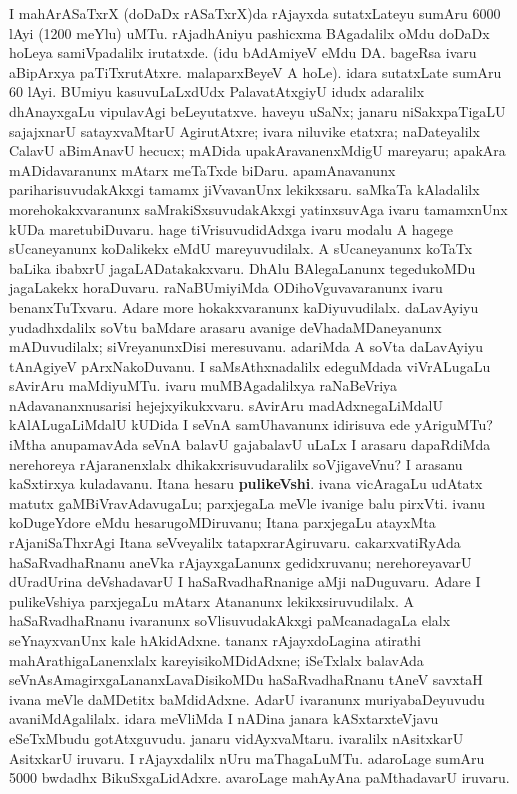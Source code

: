 \documentclass[11pt,a4size]{article}
\begin{document}
I mahArASaTxrX (doDaDx rASaTxrX)da rAjayxda sutatxLateyu sumAru 6000
lAyi (1200 meYlu) uMTu. rAjadhAniyu pashicxma BAgadalilx oMdu doDaDx
hoLeya samiVpadalilx irutatxde. (idu bAdAmiyeV eMdu DA. bageRsa ivaru
aBipArxya paTiTxrutAtxre. malaparxBeyeV A hoLe). idara sutatxLate
sumAru 60 lAyi. BUmiyu kasuvuLaLxdUdx PalavatAtxgiyU idudx adaralilx
dhAnayxgaLu vipulavAgi beLeyutatxve. haveyu uSaNx; janaru
niSakxpaTigaLU sajajxnarU satayxvaMtarU AgirutAtxre; ivara niluvike
etatxra; naDateyalilx CalavU aBimAnavU hecucx; mADida
upakAravanenxMdigU mareyaru; apakAra mADidavaranunx mAtarx meTaTxde
biDaru. apamAnavanunx pariharisuvudakAkxgi tamamx jiVvavanUnx
lekikxsaru. saMkaTa kAladalilx morehokakxvaranunx
saMrakiSxsuvudakAkxgi yatinxsuvAga ivaru tamamxnUnx kUDa
maretubiDuvaru. hage tiVrisuvudidAdxga ivaru modalu A hagege
sUcaneyanunx koDalikekx eMdU mareyuvudilalx. A sUcaneyanunx koTaTx
baLika ibabxrU jagaLADatakakxvaru. DhAlu BAlegaLanunx tegedukoMDu
jagaLakekx horaDuvaru. raNaBUmiyiMda ODihoVguvavaranunx ivaru
benanxTuTxvaru. Adare more hokakxvaranunx kaDiyuvudilalx. daLavAyiyu
yudadhxdalilx soVtu baMdare arasaru avanige deVhadaMDaneyanunx
mADuvudilalx; siVreyanunxDisi meresuvanu. adariMda A soVta daLavAyiyu
tAnAgiyeV pArxNakoDuvanu. I saMsAthxnadalilx edeguMdada viVrALugaLu
sAvirAru maMdiyuMTu. ivaru muMBAgadalilxya raNaBeVriya
nAdavananxnusarisi hejejxyikukxvaru. sAvirAru madAdxnegaLiMdalU
kAlALugaLiMdalU kUDida I seVnA samUhavanunx idirisuva ede yAriguMTu?
iMtha anupamavAda seVnA balavU gajabalavU uLaLx I arasaru dapaRdiMda
nerehoreya rAjaranenxlalx dhikakxrisuvudaralilx soVjigaveVnu? I
arasanu kaSxtirxya kuladavanu. Itana hesaru \textbf{pulikeVshi}. ivana
vicAragaLu udAtatx matutx gaMBiVravAdavugaLu; parxjegaLa meVle ivanige
balu pirxVti. ivanu koDugeYdore eMdu hesarugoMDiruvanu; Itana
parxjegaLu atayxMta rAjaniSaThxrAgi Itana seVveyalilx
tatapxrarAgiruvaru. cakarxvatiRyAda haSaRvadhaRnanu aneVka
rAjayxgaLanunx gedidxruvanu; nerehoreyavarU dUradUrina deVshadavarU I
haSaRvadhaRnanige aMji naDuguvaru. Adare I pulikeVshiya parxjegaLu
mAtarx Atananunx lekikxsiruvudilalx. A haSaRvadhaRnanu ivaranunx
soVlisuvudakAkxgi paMcanadagaLa elalx seYnayxvanUnx kale
hAkidAdxne. tananx rAjayxdoLagina atirathi mahArathigaLanenxlalx
kareyisikoMDidAdxne; iSeTxlalx balavAda
seVnAsAmagirxgaLananxLavaDisikoMDu haSaRvadhaRnanu tAneV savxtaH ivana
meVle daMDetitx baMdidAdxne. AdarU ivaranunx muriyabaDeyuvudu
avaniMdAgalilalx. idara meVliMda I nADina janara kASxtarxteVjavu
eSeTxMbudu gotAtxguvudu. janaru vidAyxvaMtaru. ivaralilx nAsitxkarU
AsitxkarU iruvaru. I rAjayxdalilx nUru maThagaLuMTu. adaroLage sumAru
5000 bwdadhx BikuSxgaLidAdxre. avaroLage mahAyAna paMthadavarU
iruvaru.
\end{document}
